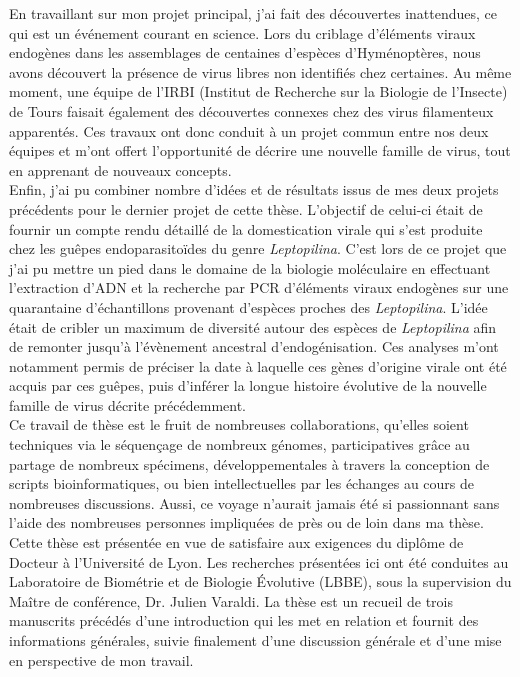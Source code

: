 En travaillant sur mon projet principal, j'ai fait des découvertes inattendues, ce qui est un événement courant en science. Lors du criblage d'éléments viraux endogènes dans les assemblages de centaines d'espèces d'Hyménoptères, nous avons découvert la présence de virus libres non identifiés chez certaines. Au même moment, une équipe de l'IRBI (Institut de Recherche sur la Biologie de l'Insecte) de Tours faisait également des découvertes connexes chez des virus filamenteux apparentés. Ces travaux ont donc conduit à un projet commun entre nos deux équipes et m'ont offert l'opportunité de décrire une nouvelle famille de virus, tout en apprenant de nouveaux concepts.\\

Enfin, j'ai pu combiner nombre d'idées et de résultats issus de mes deux projets précédents pour le dernier projet de cette thèse. L'objectif de celui-ci était de fournir un compte rendu détaillé de la domestication virale qui s'est produite chez les guêpes endoparasitoïdes du genre \textit{Leptopilina}. C'est lors de ce projet que j'ai pu mettre un pied dans le domaine de la biologie moléculaire en effectuant l'extraction d'ADN et la recherche par PCR d'éléments viraux endogènes sur une quarantaine d'échantillons provenant d'espèces proches des \textit{Leptopilina}. L'idée était de cribler un maximum de diversité autour des espèces de \textit{Leptopilina} afin de remonter jusqu'à l'évènement ancestral d'endogénisation.
Ces analyses m'ont notamment permis de préciser la date à laquelle ces gènes d'origine virale ont été acquis par ces guêpes, puis d'inférer la longue histoire évolutive de la nouvelle famille de virus décrite précédemment. \\

Ce travail de thèse est le fruit de nombreuses collaborations, qu'elles soient techniques via le séquençage de nombreux génomes, participatives grâce au partage de nombreux spécimens, développementales à travers la conception de scripts bioinformatiques, ou bien intellectuelles par les échanges au cours de nombreuses discussions. Aussi, ce voyage n’aurait jamais été si passionnant sans l'aide des nombreuses personnes impliquées de près ou de loin dans ma thèse.\\

Cette thèse est présentée en vue de satisfaire aux exigences du diplôme de Docteur à l'Université de Lyon. Les recherches présentées ici ont été conduites au Laboratoire de Biométrie et de Biologie Évolutive (LBBE), sous la supervision du Maître de conférence, Dr. Julien Varaldi. La thèse est un recueil de trois manuscrits précédés d'une introduction qui les met en relation et fournit des informations générales, suivie finalement d'une discussion générale et d'une mise en perspective de mon travail.\\


